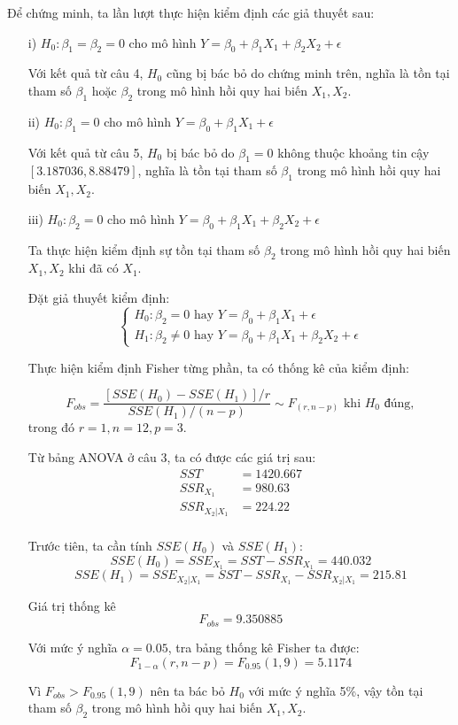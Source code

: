 \documentclass[a4paper]{article}
\theoremstyle{nonumberplain}
\begin{document}
Để chứng minh, ta lần lượt thực hiện kiểm định các giả thuyết sau:
\begin{enumerate}
	\item[i)] $H_0 : \beta_1 = \beta_2 = 0$ cho mô hình $Y = \beta_0 + \beta_1 X_1 + \beta_2 X_2 + \epsilon $
	
	Với kết quả từ câu 4, $H_0$ cũng bị bác bỏ do chứng minh trên, nghĩa là tồn tại tham số $\beta_1$ hoặc $\beta_2$ trong mô hình hồi quy hai biến $X_1, X_2$.
	
	\item[ii)] $H_0 : \beta_1 = 0$ cho mô hình $Y = \beta_0 + \beta_1 X_1 + \epsilon $
	
	Với kết quả từ câu 5, $H_0$ bị bác bỏ do $\beta_1 = 0$ không thuộc khoảng tin cậy $[3.187036,8.88479]$, nghĩa là tồn tại tham số $\beta_1$ trong mô hình hồi quy hai biến $X_1, X_2$.
	
	\item[iii)] $H_0 : \beta_2 = 0$ cho mô hình $Y = \beta_0 + \beta_1 X_1 + \beta_2 X_2 + \epsilon $
	
	Ta thực hiện kiểm định sự tồn tại tham số $\beta_2$ trong mô hình hồi quy hai biến $X_1, X_2$ khi đã có $X_1$.
	
	Đặt giả thuyết kiểm định:
	\[\begin{cases}
		H_0 : \beta_2 = 0 \text{ hay } Y = \beta_0 + \beta_1 X_1 + \epsilon \\
		H_1 : \beta_2 \ne 0 \text{ hay } Y = \beta_0 + \beta_1 X_1 + \beta_2 X_2 + \epsilon 
	\end{cases}\]
	
	Thực hiện kiểm định Fisher từng phần, ta có thống kê của kiểm định: 
	
	$$F_{obs} = \displaystyle \frac{\left [ SSE (H_0) - SSE(H_1) \right ] / r}{SSE(H_1)/(n-p)}  \sim F_{(r,n-p)} \text{ khi } H_0 \text{ đúng},$$
	trong đó $r = 1, n = 12, p = 3$.
	
	Từ bảng ANOVA ở câu 3, ta có được các giá trị sau:
	\begin{align}
		SST &= 1420.667\\
		SSR_{X_1} &= 980.63\\
		SSR_{X_2|X_1} &= 224.22 \\
	\end{align}
	
	Trước tiên, ta cần tính $SSE (H_0)$ và $SSE(H_1)$:
	$$SSE(H_0) = SSE_{X_1} = SST - SSR_{X_1} = 440.032$$
	$$SSE(H_1) = SSE_{X_2|X_1} = SST - SSR_{X_1} - SSR_{X_2|X_1} = 215.81$$
	
	Giá trị thống kê $$F_{obs} = 9.350885$$
	
	Với mức ý nghĩa $\alpha = 0.05$, tra bảng thống kê Fisher ta được:
	$$F_{1-\alpha}(r,n-p) = F_{0.95}(1,9) = 5.1174$$
	
	Vì $F_{obs} > F_{0.95}(1,9)$ nên ta bác bỏ $H_0$ với mức ý nghĩa 5\%, vậy tồn tại tham số $\beta_2$ trong mô hình hồi quy hai biến $X_1, X_2$.
\end{enumerate}
\end{document}
